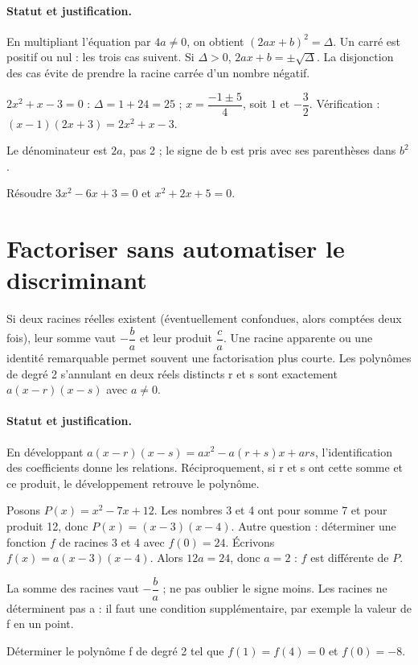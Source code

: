 \paragraph{Statut et justification.} En multipliant l’équation par $4a\ne0$, on obtient $(2ax+b)^2=\Delta$. Un carré est positif ou nul : les trois cas suivent. Si $\Delta>0$, $2ax+b=\pm\sqrt\Delta$. La disjonction des cas évite de prendre la racine carrée d’un nombre négatif.
\begin{example}$2x^2+x-3=0$ : $\Delta=1+24=25$ ; $x=\dfrac{-1\pm5}{4}$, soit $1$ et $-\dfrac{3}{2}$. Vérification : $(x-1)(2x+3)=2x^2+x-3$.\end{example}\label{C02-EX2}
\begin{pitfall}Le dénominateur est $2a$, pas 2 ; le signe de b est pris avec ses parenthèses dans $b^2$.\end{pitfall}
\begin{application}Résoudre $3x^2-6x+3=0$ et $x^2+2x+5=0$.\end{application}\label{C02-AP2}
\section{Factoriser sans automatiser le discriminant}\label{C02-U3}
\begin{keypoint}
Si deux racines réelles existent (éventuellement confondues, alors comptées deux fois), leur somme vaut $-\dfrac{b}{a}$ et leur produit $\dfrac{c}{a}$. Une racine apparente ou une identité remarquable permet souvent une factorisation plus courte. Les polynômes de degré 2 s’annulant en deux réels distincts r et s sont exactement $a(x-r)(x-s)$ avec $a\ne0$.
\end{keypoint}
\paragraph{Statut et justification.} En développant $a(x-r)(x-s)=ax^2-a(r+s)x+ars$, l’identification des coefficients donne les relations. Réciproquement, si r et s ont cette somme et ce produit, le développement retrouve le polynôme.
\begin{example}Posons $P(x)=x^2-7x+12$. Les nombres 3 et 4 ont pour somme 7 et pour produit 12, donc $P(x)=(x-3)(x-4)$. Autre question : déterminer une fonction $f$ de racines 3 et 4 avec $f(0)=24$. Écrivons $f(x)=a(x-3)(x-4)$. Alors $12a=24$, donc $a=2$ : $f$ est différente de $P$.\end{example}\label{C02-EX3}
\begin{pitfall}La somme des racines vaut $-\dfrac{b}{a}$ ; ne pas oublier le signe moins. Les racines ne déterminent pas a : il faut une condition supplémentaire, par exemple la valeur de f en un point.\end{pitfall}
\begin{application}Déterminer le polynôme f de degré 2 tel que $f(1)=f(4)=0$ et $f(0)=-8$.\end{application}\label{C02-AP3}
